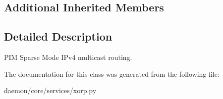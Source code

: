 \subsection*{Additional Inherited Members}


\subsection{Detailed Description}
\begin{DoxyVerb}PIM Sparse Mode IPv4 multicast routing.
\end{DoxyVerb}
 

The documentation for this class was generated from the following file\+:\begin{DoxyCompactItemize}
\item 
daemon/core/services/xorp.\+py\end{DoxyCompactItemize}
